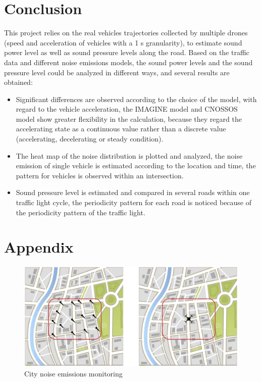 \documentclass{article}
\begin{document}
\section{Conclusion}
{\color{red}

This project relies on the real vehicles trajectories collected by multiple drones (speed and acceleration of vehicles with a 1 s granularity), to estimate sound power level as well as sound pressure levels along the road. Based on the traffic data and different noise emissions models, the sound power levels and the sound pressure level could be analyzed in different ways, and several results are obtained:
\begin{itemize}
    \item Significant differences are observed according to the choice of the model, with regard to the vehicle acceleration, the IMAGINE model and CNOSSOS model show greater flexibility in the calculation, because they regard the accelerating state as a continuous value rather than a discrete value (accelerating, decelerating or steady condition).
    \item The heat map of the noise distribution is plotted and analyzed, the noise emission of single vehicle is estimated according to the location and time, the pattern for vehicles is observed within an intersection.
    \item Sound pressure level is estimated and compared in several roads within one traffic light cycle, the periodicity pattern for each road is noticed because of the periodicity pattern of the traffic light.
\end{itemize}
}
\section{Appendix}
\begin{figure}[H]
    \begin{center}
        \includegraphics[width=14cm]{City noise emissions monitoring.png}
        \caption{City noise emissions monitoring}
        \label{City noise emissions monitoring}
    \end{center}
\end{figure}
\end{document}
